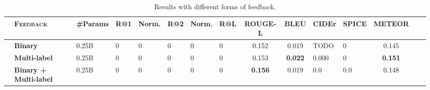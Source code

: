\begin{table}[t!]
\centering
\renewcommand{\arraystretch}{1} 
\setlength{\tabcolsep}{3pt} 
\small
\begin{tabularx}{\linewidth}{l l H HH HH Hc cH Hccc}
\toprule
&
\textsc{Feedback} & 
\textbf{\#Params} & 
R@1 & \sc Norm. & %
R@2 & \sc Norm. & %
R@L & 
\textbf{ROUGE-L} &
\textbf{BLEU} & 
\textbf{CIDEr} & 
\textbf{SPICE} &
\textbf{METEOR} &
\\ \midrule

& \textbf{Binary} 
& 0.25B & 0 & 0 & 0 & 0 & 0 & 0.152 & 0.019 & TODO &  0 & 0.145 \\ 

& \textbf{Multi-label}
& 0.25B & 0 & 0 & 0 & 0 & 0 &   0.153 &  \textbf{0.022} & 0.000  & 0 & \textbf{0.151} \\ 
& \textbf{Binary + Multi-label}
& 0.25B & 0 & 0 & 0 & 0 & 0 &  \textbf{0.156} &  0.019 & 0.0  & 0.0 & 0.148 \\ 

\bottomrule
\end{tabularx}
\vspace{-1mm}
\caption{%
Results with different forms of feedback.
}
\label{table:results-comparison-multihf}
\end{table}





